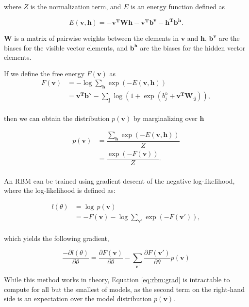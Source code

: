 \documentclass{article}
\begin{document}
where $Z$ is the normalization term, and $E$ is an energy function defined as

\[
  E \left( \mathbf{v}, \mathbf{h} \right) = 
  - \mathbf{v^TWh} - \mathbf{v^Tb^v} - \mathbf{h^Tb^h}.
\]

$\mathbf{W}$ is a matrix of pairwise weights between the elements in 
$\mathbf{v}$ and $\mathbf{h}$, $\mathbf{b^v}$ are the biases for the visible
vector elements, and $\mathbf{b^h}$ are the biases for the hidden vector
elements.

If we define the free energy $F(\mathbf{v})$ as
\begin{align*}
  F \left( \mathbf{v} \right) &= -\log \sum_{\mathbf{h}} \exp \left( -E \left( \mathbf{v,h} \right) \right) \\
  &= \mathbf{v^Tb^v} - \sum_{\mathbf{j}} \log
    \left(
      1 + \exp \left( b_j^h + \mathbf{v^TW_{\cdot j}} \right)
    \right), \\
\end{align*}

then we can obtain the distribution $p(\mathbf{v})$ by marginalizing over
$\mathbf{h}$

\begin{align*}
  p(\mathbf{v}) &= \dfrac{\sum_{\mathbf{h}} \exp(-E(\mathbf{v, h}))}{Z} \\
                &= \dfrac{\exp(-F(\mathbf{v}))}{Z}. \\
\end{align*}

An RBM can be trained using gradient descent of the negative
log-likelihood, where the log-likelihood is defined as:

\begin{align*}
  l(\theta) &= \log \, p(\mathbf{v}) \\
            &= -F(\mathbf{v}) - \log \sum_{\mathbf{v'}} \exp \left(-F(\mathbf{v'})\right), \\
\end{align*}

which yields the following gradient,

\begin{equation}
  \label{eq:rbm:grad}
  \frac{- \partial l(\theta)}{\partial \theta}
  = \frac{\partial F(\mathbf{v})}{\partial \theta} - 
  \sum_{\mathbf{v'}}\frac{\partial F(\mathbf{v'})}{\partial \theta}
                  p(\mathbf{v})
\end{equation}

While this method works in theory, Equation \ref{eq:rbm:grad} is intractable to
compute for all but the smallest of models, as the second term on the
right-hand side is an expectation over the model distribution $p(\mathbf{v})$.
\end{document}
